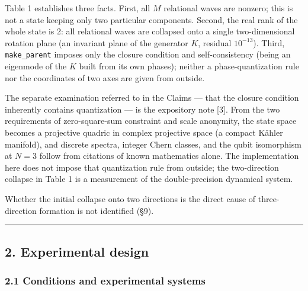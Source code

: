 \documentclass[
  a4paper,
]{article}
\begin{document}
Table 1 establishes three facts. First, all \(M\) relational waves are
nonzero; this is not a state keeping only two particular components.
Second, the real rank of the whole state is 2: all relational waves are
collapsed onto a single two-dimensional rotation plane (an invariant
plane of the generator \(K\), residual \(10^{-13}\)). Third,
\texttt{make\_parent} imposes only the closure condition and
self-consistency (being an eigenmode of the \(K\) built from its own
phases); neither a phase-quantization rule nor the coordinates of two
axes are given from outside.

The separate examination referred to in the Claims --- that the closure
condition inherently contains quantization --- is the expository note
{[}3{]}. From the two requirements of zero-square-sum constraint and
scale anonymity, the state space becomes a projective quadric in complex
projective space (a compact Kähler manifold), and discrete spectra,
integer Chern classes, and the qubit isomorphism at \(N=3\) follow from
citations of known mathematics alone. The implementation here does not
impose that quantization rule from outside; the two-direction collapse
in Table 1 is a measurement of the double-precision dynamical system.

Whether the initial collapse onto two directions is the direct cause of
three-direction formation is not identified (§9).

\begin{center}\rule{0.5\linewidth}{0.5pt}\end{center}

\subsection{2. Experimental design}\label{experimental-design}

\subsubsection{2.1 Conditions and experimental
systems}\label{conditions-and-experimental-systems}
\end{document}
